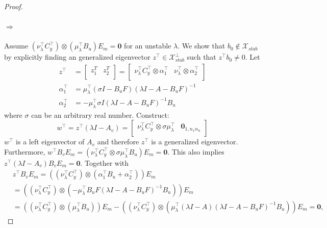 \begin{proof}
\paragraph{\(\Rightarrow\)}
Assume \((\nu_\lambda^\top C_y^\top)\otimes(\mu_\lambda^\top B_u) E_m =\mathbf{0}\) for an unstable \(\lambda\). 
We show that \(b_0\notin \mathcal{X}_{stab}\) by explicitly finding an generalized eigenvector \(z^\top \in\mathcal{X}_{stab}^\perp\) such that \(z^\top b_0 \neq 0\).
Let
\begin{align*}
    z^\top & = 
    \left[
    \begin{array}{cc}
        z_1^T & z_2^T \\
    \end{array}\right] = 
    \left[
    \begin{array}{cc}
        \nu_\lambda^\top C_y^\top \otimes \alpha_1^\top & \nu_\lambda^\top \otimes \alpha_2^\top \\
    \end{array}\right] \\
    \alpha_1^\top & = \mu_\lambda^\top (\sigma I -B_u F) (\lambda I -A -B_u F)^{-1}\\
    \alpha_2^\top & = - \mu_\lambda^\top \sigma I (\lambda I -A -B_u F)^{-1} B_u    
\end{align*}
where \(\sigma\) can be an arbitrary real number. Construct:
\[
w^\top = z^\top (\lambda I -A_v) = 
\left[
\begin{array}{cc}
    \nu_\lambda^\top C_y^\top \otimes \sigma \mu_\lambda^\top & \mathbf{0}_{1,n_x n_u} \\
\end{array}\right]
\]
\(w^\top\) is a left eigenvector of \(A_v\) and therefore \(z^\top\) is a generalized eigenvector. Furthermore,
\(w^\top B_v E_m = (\nu_\lambda^\top C_y^\top \otimes \sigma \mu_\lambda^\top B_u) E_m =\mathbf{0}\).
This also implies \(z^\top (\lambda I -A_v) B_v E_m =\mathbf{0}\).
Together with
\begin{align*}
& z^\top B_v E_m = ((\nu_\lambda^\top C_y^\top) \otimes (\alpha_1^\top B_u  +\alpha_2^\top)) E_m\\
& = ((\nu_\lambda^\top C_y^\top) \otimes (-\mu_\lambda^\top B_u F (\lambda I -A -B_u F)^{-1} B_u)) E_m \\
& = ((\nu_\lambda^\top C_y^\top) \otimes (\mu_\lambda^\top B_u)) E_m - ((\nu_\lambda^\top C_y^\top) \otimes (\mu_\lambda^\top(\lambda I -A) (\lambda I -A -B_u F)^{-1} B_u)) E_m = \mathbf{0},
\end{align*}

\end{proof}
